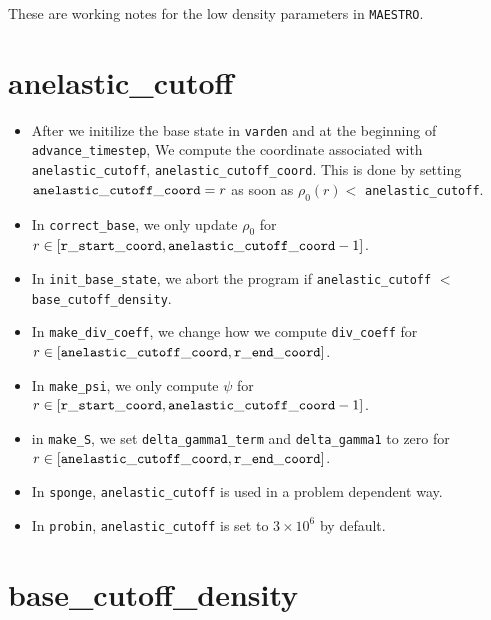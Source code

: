These are working notes for the low density parameters in {\tt MAESTRO}.

\section{anelastic\_cutoff}

\begin{itemize}

\item After we initilize the base state in {\tt varden} and at the
  beginning of {\tt advance\_timestep}, We compute the coordinate
  associated with {\tt anelastic\_cutoff}, {\tt anelastic\_cutoff\_coord}.  
  This is done by setting ${\tt anelastic\_cutoff\_coord}= r$ as soon as 
  $\rho_0(r) <$ {\tt anelastic\_cutoff}.

\item In {\tt correct\_base}, we only update $\rho_0$ for 
  $r\in[{\tt r\_start\_coord},{\tt anelastic\_cutoff\_coord}-1]$.

\item In {\tt init\_base\_state}, we abort the program if 
  {\tt anelastic\_cutoff} $<$ {\tt base\_cutoff\_density}.

\item In {\tt make\_div\_coeff}, we change how we compute {\tt div\_coeff} 
  for $r\in[{\tt anelastic\_cutoff\_coord},{\tt r\_end\_coord}]$.

\item In {\tt make\_psi}, we only compute $\psi$ for 
  $r\in[{\tt r\_start\_coord},{\tt anelastic\_cutoff\_coord}-1]$.

\item in {\tt make\_S}, we set {\tt delta\_gamma1\_term} and {\tt delta\_gamma1} 
  to zero for $r\in[{\tt anelastic\_cutoff\_coord},{\tt r\_end\_coord}]$.

\item In {\tt sponge}, {\tt anelastic\_cutoff} is used in a problem
  dependent way.

\item In {\tt probin}, {\tt anelastic\_cutoff} is set to $3\times 10^6$
  by default.

\end{itemize}

\section{base\_cutoff\_density}

